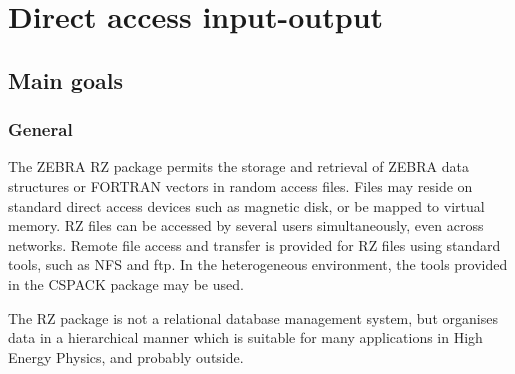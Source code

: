 \chapter{Direct access input-output}
\section{Main goals}
\subsection{General}
\par 
The ZEBRA RZ package permits the storage and retrieval of 
ZEBRA data structures or FORTRAN vectors 
in random access files. Files may reside on standard
direct access devices such as magnetic disk, or be
mapped to virtual memory. 
RZ files can be accessed by several users simultaneously,
even across networks.
Remote file access and transfer is provided for RZ files
using standard tools, such as NFS and ftp. In the heterogeneous
environment, the tools provided in the CSPACK package may be used.
\par 
The RZ package is not a relational database management system,
but organises data in a hierarchical manner which is suitable
for many applications in High Energy Physics, and probably outside.
